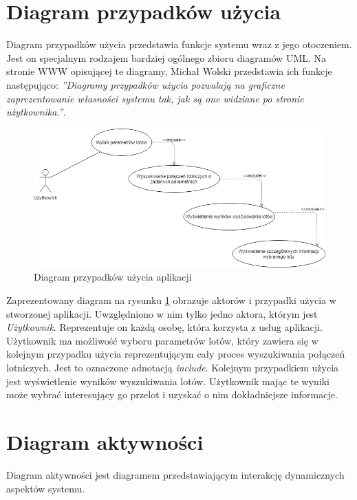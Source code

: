 \documentclass[12pt, twoside]{report}
\begin{document}
\section{Diagram przypadków użycia}
Diagram przypadków użycia przedstawia funkcje systemu wraz z jego otoczeniem. Jest on specjalnym rodzajem bardziej ogólnego zbioru diagramów UML. Na stronie WWW opisującej te diagramy, Michał Wolski przedstawia ich funkcje następująco: \emph{''Diagramy przypadków użycia pozwalają na graficzne zaprezentowanie własności systemu tak, jak są one widziane po stronie użytkownika.''}\cite{uml}.
\begin{figure}[!ht]
\centering
\includegraphics[scale=0.60, keepaspectratio]{usecase_diagram.png}
\caption{Diagram przypadków użycia aplikacji}
\label{fig:usecase_diagram}
\end{figure}

\noindent Zaprezentowany diagram na rysunku \ref{fig:usecase_diagram} obrazuje aktorów i przypadki użycia w stworzonej aplikacji. Uwzględniono w nim tylko jedno aktora, którym jest \textit{Użytkownik}. Reprezentuje on każdą osobę, która korzysta z usług aplikacji. Użytkownik ma możliwość wyboru parametrów lotów, który zawiera się w kolejnym przypadku użycia reprezentującym cały proces wyszukiwania połączeń lotniczych. Jest to oznaczone adnotacją \textit{include}. Kolejnym przypadkiem użycia jest wyświetlenie wyników wyszukiwania lotów. Użytkownik mając te wyniki może wybrać interesujący go przelot i uzyskać o nim dokładniejsze informacje.
\section{Diagram aktywności} 
Diagram aktywności jest diagramem przedstawiającym interakcję dynamicznych aspektów systemu\cite{uml}.
\end{document}
